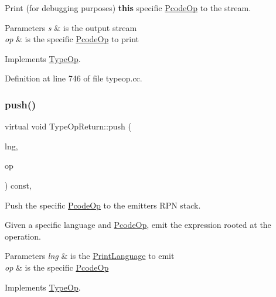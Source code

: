 Print (for debugging purposes) {\bfseries{this}} specific \mbox{\hyperlink{class_pcode_op}{Pcode\+Op}} to the stream. 


\begin{DoxyParams}{Parameters}
{\em s} & is the output stream \\
\hline
{\em op} & is the specific \mbox{\hyperlink{class_pcode_op}{Pcode\+Op}} to print \\
\hline
\end{DoxyParams}


Implements \mbox{\hyperlink{class_type_op_a60717e486917a30cc7cb6e3ce02585e1}{Type\+Op}}.



Definition at line 746 of file typeop.\+cc.

\mbox{\label{class_type_op_return_a8a11b331d3a293b7dbe4bce287313abf}} 
\subsubsection{\texorpdfstring{push()}{push()}}
{\footnotesize\ttfamily virtual void Type\+Op\+Return\+::push (\begin{DoxyParamCaption}\item[{\mbox{\hyperlink{class_print_language}{Print\+Language}} $\ast$}]{lng,  }\item[{const \mbox{\hyperlink{class_pcode_op}{Pcode\+Op}} $\ast$}]{op }\end{DoxyParamCaption}) const\hspace{0.3cm}{\ttfamily [inline]}, {\ttfamily [virtual]}}



Push the specific \mbox{\hyperlink{class_pcode_op}{Pcode\+Op}} to the emitter\textquotesingle{}s R\+PN stack. 

Given a specific language and \mbox{\hyperlink{class_pcode_op}{Pcode\+Op}}, emit the expression rooted at the operation. 
\begin{DoxyParams}{Parameters}
{\em lng} & is the \mbox{\hyperlink{class_print_language}{Print\+Language}} to emit \\
\hline
{\em op} & is the specific \mbox{\hyperlink{class_pcode_op}{Pcode\+Op}} \\
\hline
\end{DoxyParams}


Implements \mbox{\hyperlink{class_type_op_ac9c9544203ed74dabe6ac662b653b2af}{Type\+Op}}.



